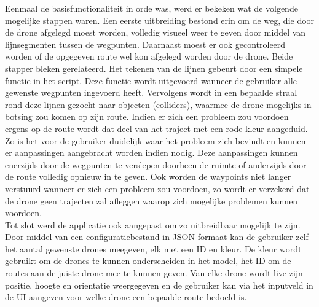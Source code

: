 Eenmaal de basisfunctionaliteit in orde was, werd er bekeken wat de volgende mogelijke stappen waren. Een eerste uitbreiding bestond erin om de weg, die door de drone afgelegd moest worden, volledig visueel weer te geven door middel van lijnsegmenten tussen de wegpunten. Daarnaast moest er ook gecontroleerd worden of de opgegeven route wel kon afgelegd worden door de drone. Beide stapper bleken gerelateerd. Het tekenen van de lijnen gebeurt door een simpele functie in het script. Deze functie wordt uitgevoerd wanneer de gebruiker alle gewenste wegpunten ingevoerd heeft. Vervolgens wordt in een bepaalde straal rond deze lijnen gezocht naar objecten (colliders), waarmee de drone mogelijks in botsing zou komen op zijn route. Indien er zich een probleem zou voordoen ergens op de route wordt dat deel van het traject met een rode kleur aangeduid. Zo is het voor de gebruiker duidelijk waar het probleem zich bevindt en kunnen er aanpassingen aangebracht worden indien nodig. Deze aanpassingen kunnen enerzijds door de wegpunten te verslepen doorheen de ruimte of anderzijds door de route volledig opnieuw in te geven. Ook worden de waypoints niet langer verstuurd wanneer er zich een probleem zou voordoen, zo wordt er verzekerd dat de drone geen trajecten zal afleggen waarop zich mogelijke problemen kunnen voordoen.\\

Tot slot werd de applicatie ook aangepast om zo uitbreidbaar mogelijk te zijn.
Door middel van een configuratiebestand in JSON formaat kan de gebruiker zelf het aantal gewenste drones meegeven, elk met een ID en kleur.
De kleur wordt gebruikt om de drones te kunnen onderscheiden in het model, het ID om de routes aan de juiste drone mee te kunnen geven.
Van elke drone wordt live zijn positie, hoogte en orientatie weergegeven en de gebruiker kan via het inputveld in de UI aangeven voor welke drone een bepaalde route bedoeld is.